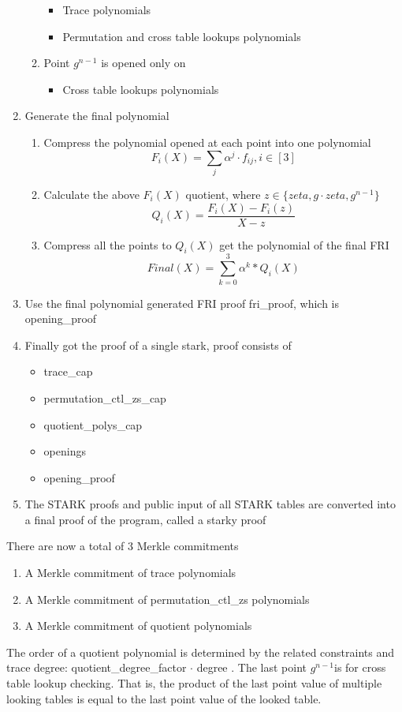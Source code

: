\begin{enumerate}
\begin{enumerate}
            \begin{itemize}
                \item Trace polynomials
                \item Permutation and cross table lookups polynomials
            \end{itemize}
        \item Point $ g^{n-1} $ is opened only on
            \begin{itemize}
                \item Cross table lookups polynomials
            \end{itemize}
        \end{enumerate}
    \item Generate the final polynomial
        \begin{enumerate}
            \item Compress the polynomial opened at each point into one polynomial $$ F_i(X) = \sum_{j} \alpha^j \cdot f_{ij}, i \in [3] $$
            \item Calculate the above $ F_i(X) $ quotient, where $ z \in \{ zeta, g \cdot zeta, g^{n-1} \} $ $$ Q_i(X) = \frac{F_i(X) - F_i(z)}{X - z} $$
            \item Compress all the points to $ Q_i(X) $ get the polynomial of the final FRI $$ Final(X) = \sum_{k=0}^3 \alpha^k * Q_i(X) $$
        \end{enumerate}
    \item Use the final polynomial generated FRI proof fri\_proof, which is opening\_proof
    \item Finally got the proof of a single stark, proof consists of
        \begin{itemize}
            \item trace\_cap
            \item permutation\_ctl\_zs\_cap
            \item quotient\_polys\_cap
            \item openings
            \item opening\_proof
        \end{itemize}
    \item The STARK proofs and public input of all STARK tables are converted into a final proof of the program, called a starky proof
\end{enumerate}

\noindent There are now a total of 3 Merkle commitments

\begin{enumerate}
    \item A Merkle commitment of trace polynomials
    \item A Merkle commitment of permutation\_ctl\_zs polynomials
    \item A Merkle commitment of quotient polynomials
\end{enumerate}

The order of a quotient polynomial is determined by the related constraints and trace degree: quotient\_degree\_factor $ \cdot $ degree . The last point $ g^{n-1} $is for cross table lookup checking. That is, the product of the last point value of multiple looking tables is equal to the last point value of the looked table.
